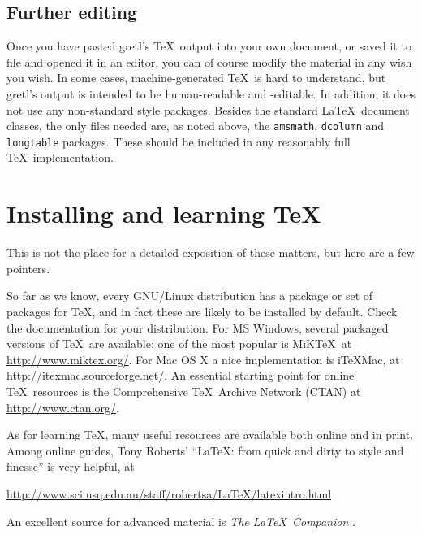 \subsection{Further editing}

Once you have pasted gretl's \TeX\ output into your own
document, or saved it to file and opened it in an editor, you can of
course modify the material in any wish you wish.  In some cases,
machine-generated \TeX\ is hard to understand, but gretl's
output is intended to be human-readable and -editable.  In addition,
it does not use any non-standard style packages.  Besides the standard
\LaTeX\ document classes, the only files needed are, as noted above,
the \verb+amsmath+, \verb+dcolumn+ and \verb+longtable+ packages.
These should be included in any reasonably full \TeX\ implementation.


\section{Installing and learning \TeX}
\label{tex-install}

This is not the place for a detailed exposition of these matters, but
here are a few pointers.  

So far as we know, every GNU/Linux distribution has a package or set
of packages for \TeX, and in fact these are likely to be installed by
default.  Check the documentation for your distribution.  For MS
Windows, several packaged versions of \TeX\ are available: one of the
most popular is MiK\TeX\, at \url{http://www.miktex.org/}.  For Mac OS
X a nice implementation is i\TeX{}Mac, at
\url{http://itexmac.sourceforge.net/}.  An essential starting point for
online \TeX\ resources is the Comprehensive
\TeX\ Archive Network (CTAN) at \url{http://www.ctan.org/}.

As for learning \TeX, many useful resources are available both online
and in print.  Among online guides, Tony Roberts' ``\LaTeX: from quick
and dirty to style and finesse'' is very helpful, at

\url{http://www.sci.usq.edu.au/staff/robertsa/LaTeX/latexintro.html}

An excellent source for advanced material is \emph{The \LaTeX\
  Companion} \citep{goossens04}.


